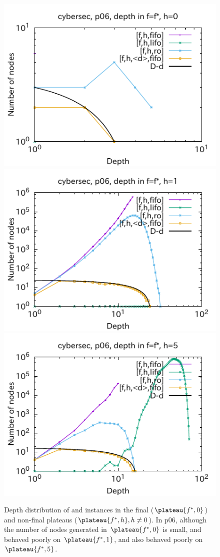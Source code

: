 \begin{figure}[htbp]
\includegraphics[width=0.49\linewidth]{img/output-lmcut/cybersec/p06-0.pdf}
\includegraphics[width=0.49\linewidth]{img/output-lmcut/cybersec/p06-1.pdf}
\includegraphics[width=0.49\linewidth]{img/output-lmcut/cybersec/p06-5.pdf}
 \caption{Depth distribution of  and  instances in the final ($\plateau{f^*,0}$) and non-final plateaus ($\plateau{f^*,h}, h\not=0$). In  p06, although the number of nodes generated in $\plateau{f^*,0}$ is small, \fifo and \ro behaved poorly on $\plateau{f^*,1}$, and also \lifo behaved poorly on $\plateau{f^*,5}$.
 }
 \label{fig:depth-histogram4}
\end{figure}




